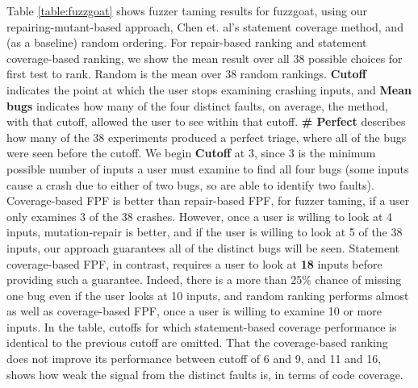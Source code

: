 Table \ref{table:fuzzgoat} shows fuzzer taming results for fuzzgoat, using our repairing-mutant-based approach, Chen et. al's \cite{PLDI13} statement coverage method, and (as a baseline) random ordering.  For repair-based ranking and statement coverage-based ranking, we show the mean result over all 38 possible choices for first test to rank.  Random is the mean over 38 random rankings.  {\bf Cutoff} indicates the point at which the user stops examining crashing inputs, and {\bf Mean bugs} indicates how many of the four distinct faults, on average, the method, with that cutoff, allowed the user to see within that cutoff.  {\bf \# Perfect} describes how many of the 38 experiments produced a perfect triage, where all of the bugs were seen before the cutoff.  We begin {\bf Cutoff} at 3, since 3 is the minimum possible number of inputs a user must examine to find all four bugs (some inputs cause a crash due to either of two bugs, so are able to identify two faults).  Coverage-based FPF is better than repair-based FPF, for fuzzer taming, if a user only examines 3 of the 38 crashes.  However, once a user is willing to look at 4 inputs, mutation-repair is better, and if the user is willing to look at 5 of the 38 inputs, our approach guarantees all of the distinct bugs will be seen.  Statement coverage-based FPF, in contrast, requires a user to look at {\bf 18} inputs before providing such a guarantee.  Indeed, there is a more than 25\% chance of missing one bug even if the user looks at 10 inputs, and random ranking performs almost as well as coverage-based FPF, once a user is willing to examine 10 or more inputs.  In the table, cutoffs for which statement-based coverage performance is identical to the previous cutoff are omitted.  That the coverage-based ranking does not improve its performance between cutoff of 6 and 9, and 11 and 16, shows how weak the signal from the distinct faults is, in terms of code coverage.

